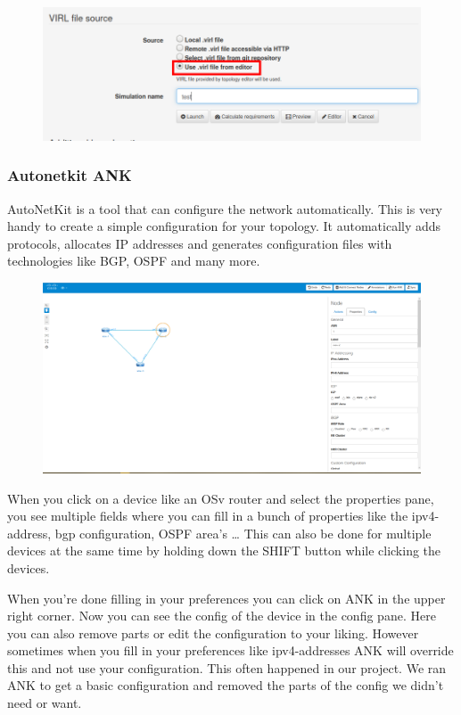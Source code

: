 \documentclass{article}
\begin{document}
\begin{figure}[H]
	\centering
	\includegraphics[width=\textwidth]{images/Virl_from_editor.png}
\end{figure}

\subsubsection{Autonetkit ANK}
AutoNetKit is a tool that can configure the network automatically. This is very handy to create a simple configuration for your topology.
It automatically adds protocols, allocates IP addresses and generates configuration files with technologies like BGP, OSPF and many more.

\begin{figure}[H]
	\centering
	\includegraphics[width=\textwidth]{images/ANK.png}
\end{figure}

When you click on a device like an OSv router and select the properties pane,
you see multiple fields where you can fill in a bunch of properties like the ipv4-address, bgp configuration, OSPF area's \dots
This can also be done for multiple devices at the same time by holding down the SHIFT button while clicking the devices.

When you're done filling in your preferences you can click on ANK in the upper right corner.
Now you can see the config of the device in the config pane.
Here you can also remove parts or edit the configuration to your liking.
However sometimes when you fill in your preferences like ipv4-addresses ANK will override this and not use your configuration.
This often happened in our project.
We ran ANK to get a basic configuration and removed the parts of the config we didn't need or want.
\end{document}
